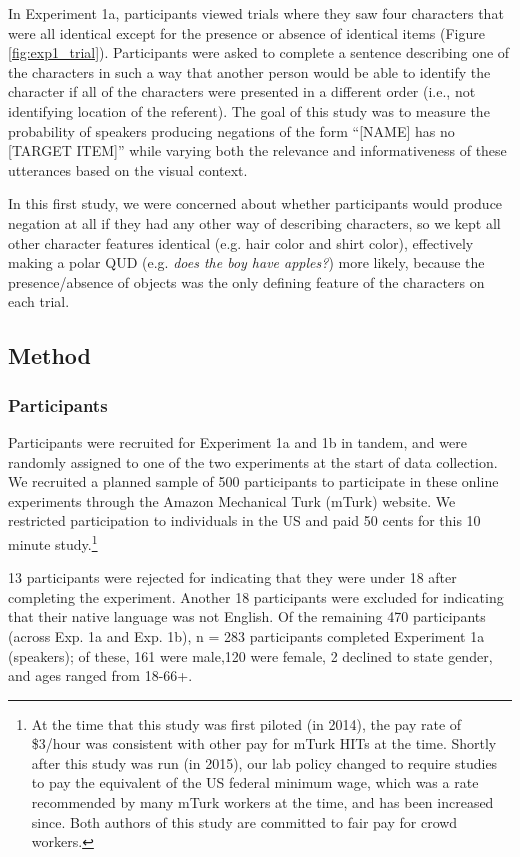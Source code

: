 \documentclass[man, floatsintext, noapacite]{apa6}
\begin{document}
In Experiment 1a, participants viewed trials where they saw four characters that were all identical except for the presence or absence of identical items (Figure \ref{fig:exp1_trial}). Participants were asked to complete a sentence describing one of the characters in such a way that another person would be able to identify the character if all of the characters were presented in a different order (i.e., not identifying location of the referent). The goal of this study was to measure the probability of speakers producing negations of the form ``[NAME] has no [TARGET ITEM]'' while varying both the relevance and informativeness of these utterances based on the visual context. 

In this first study, we were concerned about whether participants would produce negation at all if they had any other way of describing characters, so we kept all other character features identical (e.g. hair color and shirt color), effectively making a polar QUD (e.g. \textit{does the boy have apples?}) more likely, because the presence/absence of objects was the only defining feature of the characters on each trial. 

\subsection{Method}

\subsubsection{Participants} 

Participants were recruited for Experiment 1a and 1b in tandem, and were randomly assigned to one of the two experiments at the start of data collection. We recruited a planned sample of 500 participants to participate in these online experiments through the Amazon Mechanical Turk (mTurk) website. We restricted participation to individuals in the US and paid 50 cents for this 10 minute study.\footnote{At the time that this study was first piloted (in 2014), the pay rate of \$3/hour was consistent with other pay for mTurk HITs at the time. Shortly after this study was run (in 2015), our lab policy changed to require studies to pay the equivalent of the US federal minimum wage, which was a rate recommended by many mTurk workers at the time, and has been increased since. Both authors of this study are committed to fair pay for crowd workers.}

 13 participants were rejected for indicating that they were under 18 after completing the experiment. Another 18 participants were excluded for indicating that their native language was not English. Of the remaining 470 participants (across Exp. 1a and Exp. 1b), n = 283 participants completed Experiment 1a (speakers); of these, 161 were male,120 were female, 2 declined to state gender, and ages ranged from 18-66+.
\end{document}
